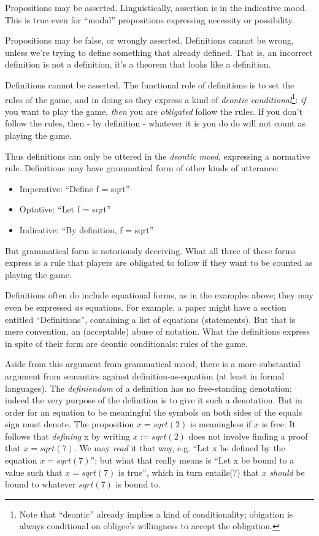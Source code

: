 \documentclass{article}
\begin{document}
Propositions may be asserted. Linguistically, assertion is in the
indicative mood. This is true even for ``modal'' propositions
expressing necessity or possibility.

Propositions may be false, or wrongly asserted. Definitions cannot be
wrong, unless we're trying to define something that already defined.
That is, an incorrect definition is not a definition, it's a theorem
that looks like a definition.

Definitions cannot be asserted. The functional role of definitions is
to set the rules of the game, and in doing so they express a kind of
\textit{deontic conditional}\footnote{Note that ``deontic'' already
implies a kind of conditionality; obigation is always conditional on
obligee's willingness to accept the obligation.}: \textit{if} you want
to play the game, \textit{then} you are \textit{obligated} follow the
rules. If you don't follow the rules, then - by definition - whatever
it is you do do will not count as playing the game.

Thus definitions can only be uttered in the \textit{deontic mood},
expressing a normative rule. Definitions may have grammatical form of
other kinds of utterance:

\begin{itemize}
\item Imperative: ``Define f = sqrt''
\item Optative: ``Let  f = sqrt''
\item Indicative: ``By definition, f = sqrt''
\end{itemize}

But grammatical form is notoriously deceiving. What all three of these
forms express is a rule that players are obligated to follow if they
want to be counted as playing the game.

Definitions often do include equational forms, as in the examples
above; they may even be expressed \textit{as} equations. For example,
a paper might have a section entitled ``Definitions'', containing a
list of equations (statements). But that is mere convention, an
(acceptable) abuse of notation. What the definitions express in spite
of their form are deontic conditionals: rules of the game.

Aside from this argument from grammatical mood, there is a more
substantial argument from semantics against definition-as-equation (at
least in formal languages). The \textit{definiendum} of a definition
has no free-standing denotation; indeed the very purpose of the
definition is to give it such a denotation. But in order for an
equation to be meaningful the symbols on both sides of the equals sign
must denote. The proposition \(x = sqrt(2)\) is meaningless if \(x\)
is free. It follows that \textit{defining} x by writing \(x :=
sqrt(2)\) does not involve finding a proof that \(x = sqrt(7)\). We
may \textit{read} it that way, e.g. ``Let x be defined by the equation
\(x = sqrt(7)\)''; but what that really means is ``Let x be bound to a
value such that \(x = sqrt(7)\) is true'', which in turn entails(?)
that \(x\) \textit{should} be bound to whatever \(sqrt(7)\) is bound
to.
\end{document}
